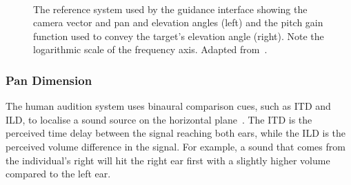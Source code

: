 \documentclass[acmsmall]{acmart}
\begin{document}
\begin{figure}
  \centering
~
  \caption{The reference system used by the guidance interface showing the camera vector and pan and elevation angles (left) and the pitch gain function used to convey the target's elevation angle (right). Note the logarithmic scale of the frequency axis. Adapted from~\citet{lock2019bone}. }
\end{figure}

\subsubsection{Pan Dimension}

The human audition system uses binaural comparison cues, such as ITD and ILD, to localise a sound source on the horizontal plane~\citep{blauert1969sound}.
The ITD is the perceived time delay between the signal reaching both ears, while the ILD is the perceived volume difference in the signal.
For example, a sound that comes from the individual's right will hit the right ear first with a slightly higher volume compared to the left ear.
\end{document}
